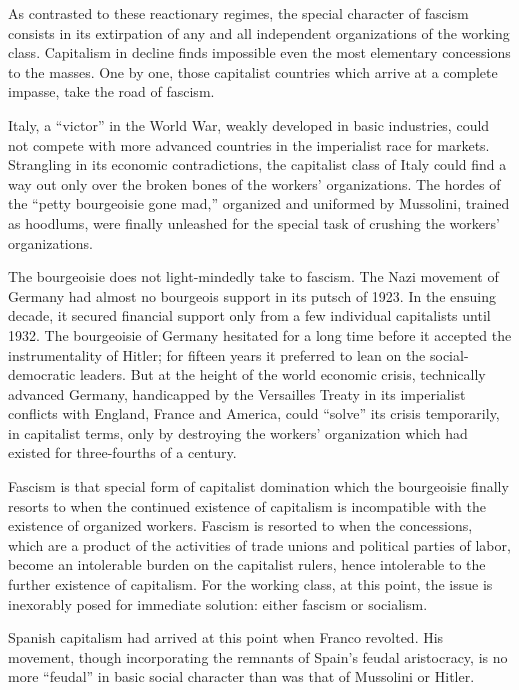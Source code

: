 As contrasted to these reactionary regimes, the special character of fascism consists in its extirpation of any and all independent organizations of the working class. Capitalism in decline finds impossible even the most elementary concessions to the masses. One by one, those capitalist countries which arrive at a complete impasse, take the road of fascism.

Italy, a ``victor'' in the World War, weakly developed in basic industries, could not compete with more advanced countries in the imperialist race for markets. Strangling in its economic contradictions, the capitalist class of Italy could find a way out only over the broken bones of the workers’ organizations. The hordes of the ``petty bourgeoisie gone mad,'' organized and uniformed by Mussolini,{\indexBMussolini} trained as hoodlums, were finally unleashed for the special task of crushing the workers’ organizations.

The bourgeoisie does not light-mindedly take to fascism. The Nazi movement of Germany had almost no bourgeois support in its putsch of 1923. In the ensuing decade, it secured financial support only from a few individual capitalists until 1932. The bourgeoisie of Germany hesitated for a long time before it accepted the instrumentality of Hitler{\indexAHitler}; for fifteen years it preferred to lean on the social-democratic leaders. But at the height of the world economic crisis, technically advanced Germany, handicapped by the Versailles Treaty in its imperialist conflicts with England, France and America, could ``solve'' its crisis temporarily, in capitalist terms, only by destroying the workers’ organization which had existed for three-fourths of a century.

Fascism is that special form of capitalist domination which the bourgeoisie finally resorts to when the continued existence of capitalism is incompatible with the existence of organized workers. Fascism is resorted to when the concessions, which are a product of the activities of trade unions and political parties of labor, become an intolerable burden on the capitalist rulers, hence intolerable to the further existence of capitalism. For the working class, at this point, the issue is inexorably posed for immediate solution: either fascism or socialism.

Spanish capitalism had arrived at this point when Franco revolted. His movement, though incorporating the remnants of Spain’s feudal aristocracy, is no more ``feudal'' in basic social character than was that of Mussolini or Hitler.

